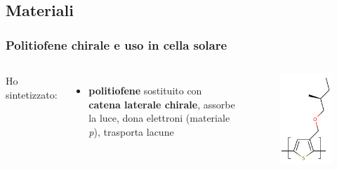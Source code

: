 \documentclass{beamer}
\begin{document}
\subsection{Materiali}
\logo{}
\begin{frame}%
\frametitle{Politiofene chirale e uso in cella solare}
\begin{columns}
Ho sintetizzato:
\begin{itemize}
\item \textbf{politiofene} sostituito con \textbf{catena laterale chirale}, assorbe la luce, dona elettroni (materiale \textit{p}), trasporta lacune
\end{itemize}
\begin{figure}\vspace{-20pt}\centering \includegraphics[width=1\textwidth]{img/polimero.pdf}\end{figure}

\end{columns}
\end{frame}
\end{document}
